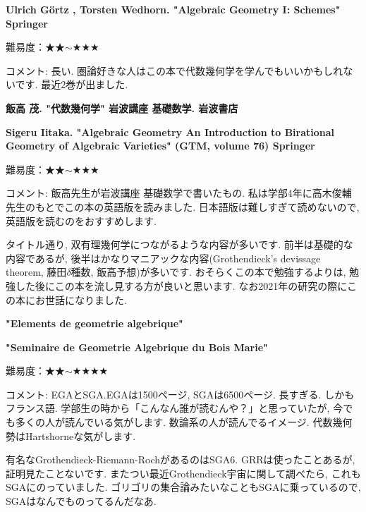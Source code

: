 \textbf{Ulrich G\"ortz , Torsten Wedhorn. "Algebraic Geometry I: Schemes" Springer}

難易度：★★$\sim$★★★  \vspace{-6pt}

コメント: 長い. 圏論好きな人はこの本で代数幾何学を学んでもいいかもしれないです. 最近2巻が出ました. 
\vspace{8pt}

\textbf{飯高 茂. "代数幾何学" 岩波講座 基礎数学. 岩波書店} \vspace{-6pt}

\textbf{Sigeru Iitaka. "Algebraic Geometry
An Introduction to Birational Geometry of Algebraic Varieties"  (GTM, volume 76) Springer} \vspace{-6pt}

難易度：★★$\sim$★★★  \vspace{-6pt} 

コメント: 飯高先生が岩波講座 基礎数学で書いたもの. 私は学部4年に高木俊輔先生のもとでこの本の英語版を読みました. 日本語版は難しすぎて読めないので, 英語版を読むのをおすすめします.

タイトル通り, 双有理幾何学につながるような内容が多いです. %
前半は基礎的な内容であるが, 後半はかなりマニアックな内容(Grothendieck's devissage theorem, 藤田$\delta$種数, 飯高予想)が多いです. おそらくこの本で勉強するよりは, 勉強した後にこの本を流し見する方が良いと思います. なお2021年の研究の際にこの本にお世話になりました.
\vspace{8pt}


\textbf{"Elements de geometrie algebrique"} \vspace{-6pt}

\textbf{"Seminaire de Geometrie Algebrique du Bois Marie"} \vspace{-6pt}

難易度：★★$\sim$★★★★  \vspace{-6pt} 

コメント:  EGAとSGA.EGAは1500ページ, SGAは6500ページ. 長すぎる. しかもフランス語. 
学部生の時から「こんなん誰が読むんや？」と思っていたが, 今でも多くの人が読んでいる気がします. 数論系の人が読んでるイメージ. 代数幾何勢はHartshorneな気がします. 

有名なGrothendieck-Riemann-RochがあるのはSGA6. GRRは使ったことあるが, 証明見たことないです. 
またつい最近Grothendieck宇宙に関して調べたら, これもSGAにのっていました. ゴリゴリの集合論みたいなこともSGAに乗っているので, SGAはなんでものってるんだなあ.

